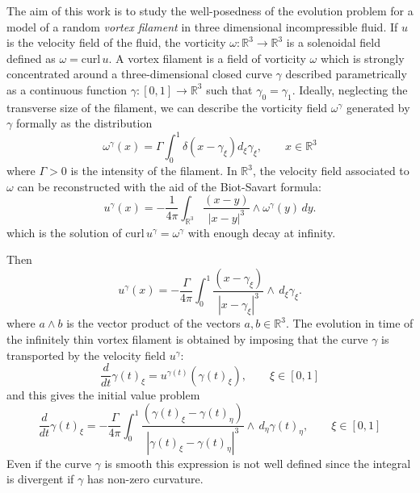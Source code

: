 \documentclass[a4paper,12pt,reqno]{amsart}
\newcommand{\R}{\mathbb{R}}
\begin{document}
The aim of this work is to study the well-posedness of the evolution
problem for a model of a random \emph{vortex filament} in
three dimensional incompressible fluid. If $u$ is the velocity field
of the fluid, the vorticity $\omega : \mathbb{R}^3 \to \mathbb{R}^3$
is a solenoidal field defined as $\omega = \text{curl}\, u$. 
A vortex filament is a field of vorticity $\omega$  
which is strongly concentrated around a three-dimensional closed curve
$\gamma$ described parametrically as a continuous function $\gamma :
[0,1] \to \mathbb{R}^3$ such that $\gamma_0 = \gamma_1$. Ideally, neglecting the transverse size of
the filament, we can describe the vorticity field $\omega^\gamma$
generated by $\gamma$ formally as the distribution
\begin{equation}\label{formal}
  \omega^\gamma(x)=\Gamma\int_0^1\delta(x-\gamma_\xi) d_\xi \gamma_\xi,
  \qquad x \in\mathbb{R}^3
\end{equation}
where $\Gamma > 0$ is the intensity of the filament. In
$\mathbb{R}^3$, the velocity field associated to $\omega$ can be
reconstructed with the aid of the Biot-Savart formula:
\begin{equation}\label{biot-savart}
u^\gamma(x)=-\frac{1}{4\pi} \int_{\R^3}\frac{(x-y)}{|x-y|^3}\wedge \omega^\gamma( y)\,d y.
\end{equation}
which is the solution of $\text{curl}\, u^\gamma = \omega^\gamma$ with
enough decay at infinity.

Then
\begin{equation}\label{biot-savart2}
u^\gamma(x)=-\frac{\Gamma}{4\pi}
\int_0^1\frac{(x-\gamma_\xi)}{|x-\gamma_\xi|^3}\wedge \, d_\xi \gamma_\xi.
\end{equation}
where $a \wedge b$ is the vector product of the vectors $a,b \in
\mathbb{R}^3$. The evolution in time of the infinitely thin vortex filament is
obtained by imposing that the curve $\gamma$ is transported by the
velocity field $u^\gamma$:
\begin{equation}
  \label{eq:evolution1}
 \frac{d}{dt} \gamma(t)_\xi = u^{\gamma(t)}(\gamma(t)_\xi)
, \qquad \xi
 \in [0,1]  
\end{equation}
and this gives the initial value problem
\begin{equation}
  \label{eq:evolution2}
 \frac{d}{dt} \gamma(t)_\xi 
= -\frac{\Gamma}{4\pi}
\int_0^1\frac{(\gamma(t)_\xi-\gamma(t)_\eta)}{|\gamma(t)_\xi-\gamma(t)_\eta|^3}\wedge \, d_\eta \gamma(t)_\eta
, \qquad \xi
 \in [0,1]  
\end{equation}
Even if the curve $\gamma$ is smooth this expression is not well
defined since the integral is divergent if $\gamma$ has non-zero
curvature. 
 
\end{document}
